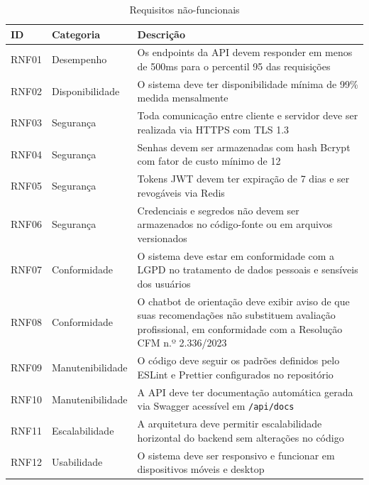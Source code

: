 \begin{table}[H]
  \centering
  \caption{Requisitos não-funcionais}
  \label{tab:non-functional-requirements}
  \begin{tabular}{p{1.2cm}p{3.8cm}p{6.2cm}}
    \toprule
    \textbf{ID} &
    \textbf{Categoria} &
    \textbf{Descrição} \\
    \midrule
    RNF01 & Desempenho
          & Os endpoints da API devem responder
            em menos de 500ms para o percentil
            95 das requisições \\
    RNF02 & Disponibilidade
          & O sistema deve ter disponibilidade
            mínima de 99\% medida mensalmente \\
    RNF03 & Segurança
          & Toda comunicação entre cliente e
            servidor deve ser realizada via
            HTTPS com TLS 1.3 \\
    RNF04 & Segurança
          & Senhas devem ser armazenadas com
            hash Bcrypt com fator de custo
            mínimo de 12 \cite{provos1999} \\
    RNF05 & Segurança
          & Tokens JWT devem ter expiração de
            7 dias e ser revogáveis via Redis
            \cite{rfc7519} \\
    RNF06 & Segurança
          & Credenciais e segredos não devem
            ser armazenados no código-fonte
            ou em arquivos versionados \\
    RNF07 & Conformidade
          & O sistema deve estar em conformidade
            com a LGPD no tratamento de dados
            pessoais e sensíveis dos usuários
            \cite{lgpd2018} \\
    RNF08 & Conformidade
          & O chatbot de orientação deve exibir
            aviso de que suas recomendações não
            substituem avaliação profissional,
            em conformidade com a Resolução
            CFM n.º 2.336/2023 \cite{cfm23362023} \\
    RNF09 & Manutenibilidade
          & O código deve seguir os padrões
            definidos pelo ESLint e Prettier
            configurados no repositório \\
    RNF10 & Manutenibilidade
          & A API deve ter documentação
            automática gerada via Swagger
            acessível em \texttt{/api/docs} \\
    RNF11 & Escalabilidade
          & A arquitetura deve permitir
            escalabilidade horizontal do
            backend sem alterações no código \\
    RNF12 & Usabilidade
          & O sistema deve ser responsivo e
            funcionar em dispositivos móveis
            e desktop \\
    \bottomrule
  \end{tabular}
\end{table}

